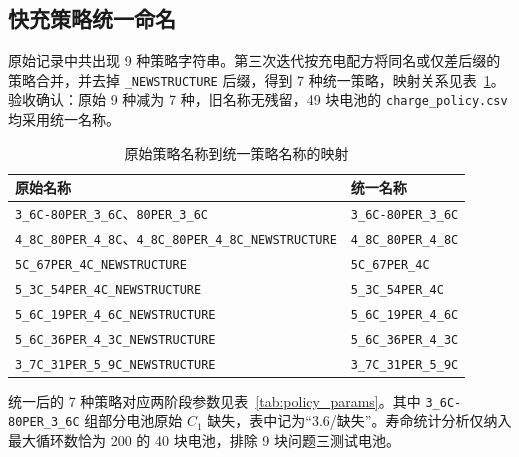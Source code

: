 \subsection{快充策略统一命名}

原始记录中共出现 9 种策略字符串。第三次迭代按充电配方将同名或仅差后缀的策略合并，并去掉 \texttt{\_NEWSTRUCTURE} 后缀，得到 7 种统一策略，映射关系见表~\ref{tab:policy_map}。验收确认：原始 9 种减为 7 种，旧名称无残留，49 块电池的 \texttt{charge\_policy.csv} 均采用统一名称。

\begin{table}[htbp]
\centering
\caption{原始策略名称到统一策略名称的映射}
\label{tab:policy_map}
\small
\begin{tabular}{ll}
\toprule
原始名称 & 统一名称 \\
\midrule
\texttt{3\_6C-80PER\_3\_6C}、\texttt{80PER\_3\_6C} & \texttt{3\_6C-80PER\_3\_6C} \\
\texttt{4\_8C\_80PER\_4\_8C}、\texttt{4\_8C\_80PER\_4\_8C\_NEWSTRUCTURE} & \texttt{4\_8C\_80PER\_4\_8C} \\
\texttt{5C\_67PER\_4C\_NEWSTRUCTURE} & \texttt{5C\_67PER\_4C} \\
\texttt{5\_3C\_54PER\_4C\_NEWSTRUCTURE} & \texttt{5\_3C\_54PER\_4C} \\
\texttt{5\_6C\_19PER\_4\_6C\_NEWSTRUCTURE} & \texttt{5\_6C\_19PER\_4\_6C} \\
\texttt{5\_6C\_36PER\_4\_3C\_NEWSTRUCTURE} & \texttt{5\_6C\_36PER\_4\_3C} \\
\texttt{3\_7C\_31PER\_5\_9C\_NEWSTRUCTURE} & \texttt{3\_7C\_31PER\_5\_9C} \\
\bottomrule
\end{tabular}
\end{table}

统一后的 7 种策略对应两阶段参数见表~\ref{tab:policy_params}。其中 \texttt{3\_6C-80PER\_3\_6C} 组部分电池原始 \(C_1\) 缺失，表中记为“3.6/缺失”。寿命统计分析仅纳入最大循环数恰为 200 的 40 块电池，排除 9 块问题三测试电池。


